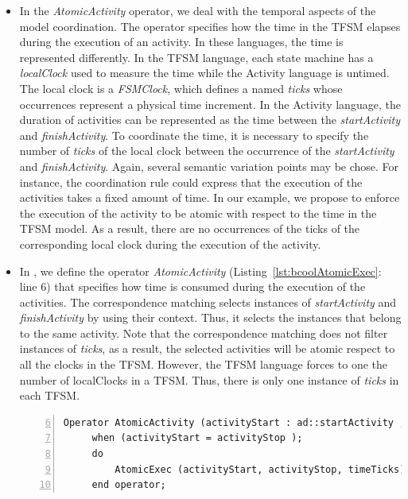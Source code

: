 \begin{itemize}
	
	 \item In the \emph{AtomicActivity} operator, we deal with the temporal aspects of the model coordination. The operator specifies how the time in the TFSM elapses during the execution of an activity. In these languages, the time is represented differently. In the TFSM language, each state machine has a \emph{localClock} used to measure the time while the Activity language is untimed. The local clock is a \emph{FSMClock}, which defines a \dse named \emph{ticks} whose occurrences represent a physical time increment. In the Activity language, the duration of activities can be represented as the time between the \dse \emph{startActivity} and \dse \emph{finishActivity}. To coordinate the time, it is necessary to specify the number of \emph{ticks} of the local clock between the occurrence of the \dse \emph{startActivity} and \emph{finishActivity}. Again, several semantic variation points may be chose. For instance, the coordination rule could express that the execution of the activities takes a fixed amount of time. In our example, we propose to enforce the execution of the activity to be atomic with respect to the time in the TFSM model. As a result, there are no occurrences of the \dse ticks of the corresponding local clock during the execution of the activity.
	 
	 
	 \item In \bcool, we define the operator \emph{AtomicActivity} (Listing~\ref{lst:bcoolAtomicExec}: line 6) that specifies how time is consumed during the execution of the activities. The correspondence matching selects instances of \dse \emph{startActivity} and \emph{finishActivity} by using their context. Thus, it selects the instances that belong to the same activity. Note that the correspondence matching does not filter instances of \dse \emph{ticks}, as a result, the selected activities will be atomic respect to all the clocks in the TFSM. However, the TFSM language forces to one the number of localClocks in a TFSM. Thus, there is only one instance of \dse \emph{ticks} in each TFSM. 
	 
	 
	 \begin{lstlisting}[language=bcool,
	 caption={Timing operator between TFSM and Activity languages},
	 label={lst:bcoolAtomicExec}, 
	 basicstyle=\scriptsize\ttfamily, backgroundcolor=\color{LGrey}, numbers=left, xleftmargin=2pt, firstnumber=6]
	 Operator AtomicActivity (activityStart : ad::startActivity , activityStop : ad::finishActivity, timeTicks : tfsm::ticks)
	 when (activityStart = activityStop );
	 do 
		 AtomicExec (activityStart, activityStop, timeTicks)
	 end operator;
	 \end{lstlisting}
	 

\end{itemize}
